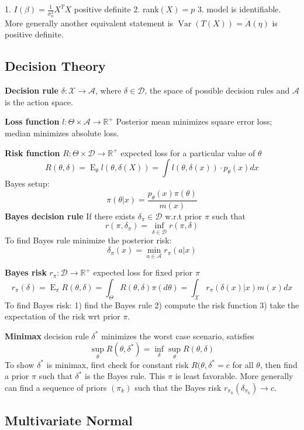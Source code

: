 \documentclass[10pt, twocolumn]{article}
\newcommand{\Expect}{\operatorname{E}}
\newcommand{\Var}{\operatorname{Var}}
\begin{document}
1. $I(\beta) = \frac{1}{\sigma_0^2} X^T X$ positive definite
2. rank$(X) = p$
3. model is identifiable. More generally another equivalent statement is
$\Var (T(X)) = \ddot{A} (\eta)$ is positive definite.

\subsection*{Decision Theory}

\textbf{Decision rule} $\delta: \mathcal{X} \rightarrow \mathcal{A}$, where 
$\delta \in \mathcal{D}$, the space of possible decision rules and
$\mathcal{A}$ is the action space.

\textbf{Loss function} $l: \Theta \times \mathcal{A} \rightarrow \mathbb{R}^+$
Posterior mean minimizes square error loss; median minimizes absolute loss.

\textbf{Risk function} $R: \Theta \times \mathcal{D} \rightarrow
\mathbb{R}^+$ expected loss for a particular value of $\theta$
\[
    R(\theta, \delta) = \Expect_\theta l(\theta, \delta(X)) = \int
    l(\theta, \delta(x)) \cdot p_\theta (x) dx
\]
Bayes setup:
\[
    \pi(\theta | x) = \frac{p_\theta (x) \pi(\theta)}{m(x)}
\]
\textbf{Bayes decision rule} If there exists $\delta_\pi \in \mathcal{D}$
w.r.t prior $\pi$ such that
\[
    r(\pi, \delta_\pi) = \inf_{\delta \in \mathcal{D}} r(\pi, \delta)
\]
To find Bayes rule minimize the posterior risk:
\[
    \delta_\pi (x) = \min_{a \in \mathcal{A}} r_\pi (a | x)
\]

\textbf{Bayes risk} $r_\pi : \mathcal{D} \rightarrow
\mathbb{R}^+$ expected loss for fixed prior $\pi$
\[
    r_\pi (\delta) = \Expect_\pi R(\theta, \delta) 
    = \int_\Theta R(\theta, \delta) \pi (d \theta)
    = \int_\mathcal{X} r_\pi(\delta(x) | x) m(x) dx
\]
To find Bayes risk: 1) find the Bayes rule 2) compute the risk function 3)
take the expectation of the risk wrt prior $\pi$.


\textbf{Minimax} decision rule $\delta^*$ minimizes the worst case
scenario, satisfies
\[
    \sup_{\theta} R(\theta, \delta^*) = \inf_{\delta} \sup_{\theta}
    R(\theta, \delta)
\]
To show $\delta^*$ is minimax, first check for constant risk $R(\theta,
\delta^* = c$ for all $\theta$, then find a
prior $\pi$ such that $\delta^*$ is the Bayes rule. This $\pi$ is least
favorable. More generally can find
a sequence of priors $(\pi_k)$ such that the Bayes risk $r_{\pi_k}
(\delta_{\pi_k}) \rightarrow c$.

\newpage

\subsection*{Multivariate Normal}
\end{document}
